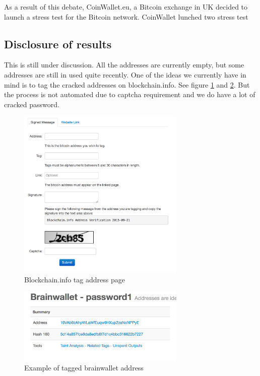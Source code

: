 As a result of this debate, CoinWallet.eu, a Bitcoin exchange in UK decided to launch a stress test for the Bitcoin network. CoinWallet lunched two stress test 

\subsection{Disclosure of results}
This is still under discussion. All the addresses are currently empty, but some addresses are still in used quite recently. One of the ideas we currently have in mind is to tag the cracked addresses on blockchain.info. See figure \ref{fig:tag_page} and \ref{fig:tagged_address}. But the process is not automated due to captcha requirement and we do have a lot of cracked password.

 \begin{figure}[h!]
 	\centering
 	\includegraphics[width=80mm]{./pics/tag_page.png}
 	\caption{Blockchain.info tag address page}
 	\label{fig:tag_page}
 \end{figure}
 
  \begin{figure}[h!]
  	\centering
  	\includegraphics[width=80mm]{./pics/tag_address.png}
  	\caption{Example of tagged brainwallet address }
  	\label{fig:tagged_address}
  \end{figure}

